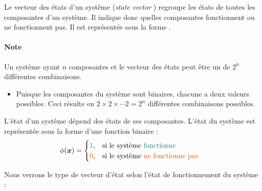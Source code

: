 \documentclass[french]{article}
\begin{document}
\begin{multicols*}{2}
\begin{definitionNOHFILLsub}
Le vecteur des états d'un système (\og \textit{state vector} \fg{}) regroupe les états de toutes les composantes d'un système. Il indique donc quelles composantes fonctionnent ou ne fonctionnent pas. Il est représentée sous la forme .

\bigskip

\paragraph{Note}	Un système ayant $n$ composantes et le vecteur des états peut être un de $2^{n}$ différentes combinaisons.
\begin{itemize}
	\item	Puisque les composantes du système sont binaires, chacune a deux valeurs possibles. Ceci résulte en $2 \times 2 \times \cdots 2 = 2^{n}$ différentes combinaisons possibles.
\end{itemize}
\end{definitionNOHFILLsub}

\begin{definitionNOHFILLsub}
L'état d'un système dépend des états de ses composantes. L'état du système est représentée sous la forme d'une fonction  binaire :
\begin{align*}
	\phi(\bm{x})
	&=	\begin{cases}
		\textcolor{teal}{1},	&	\text{si le système \textcolor{teal}{fonctionne}}	\\
		\textcolor{burntorange}{0},	&	\text{si le système \textcolor{burntorange}{ne fonctionne pas}}	
		\end{cases}
\end{align*}
\end{definitionNOHFILLsub}

Nous verrons le type de vecteur d'état selon l'état de fonctionnement du système : 
\begin{center}
\end{center}
\end{multicols*}
\end{document}

